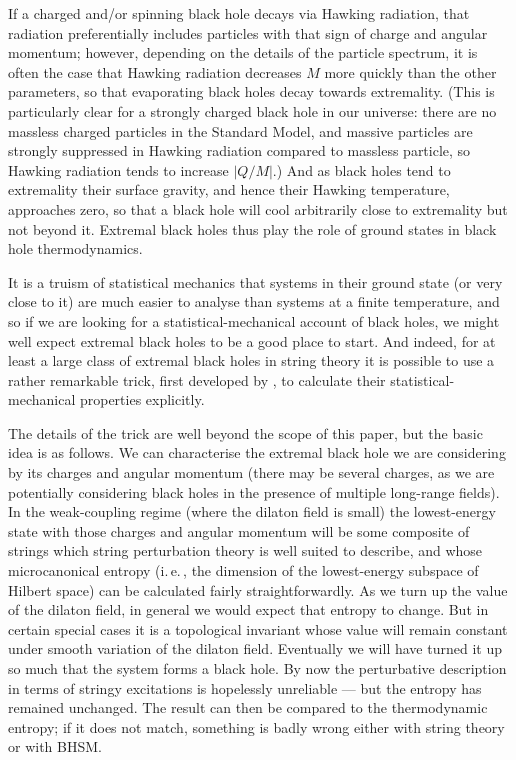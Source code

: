 \documentclass{article}
\newcommand{\iec}{\mbox{i.\,e.\,}}
\begin{document}
 If a charged and/or spinning black hole decays via Hawking radiation, that radiation preferentially includes particles with that sign of charge and angular momentum; however, depending on the details of the particle spectrum, it is often the case that Hawking radiation decreases $M$ more quickly than the other parameters, so that evaporating black holes decay towards extremality. (This is particularly clear for a strongly charged black hole in our universe: there are no massless charged particles in the Standard Model, and massive particles are strongly suppressed in Hawking radiation compared to massless particle, so Hawking radiation tends to increase $|Q/M|$.) And as black holes tend to extremality their surface gravity, and hence their Hawking temperature, approaches zero, so that a black hole will cool arbitrarily close to extremality but not beyond it. Extremal black holes thus play the role of ground states in black hole thermodynamics.
 
 It is a truism of statistical mechanics that systems in their ground state (or very close to it) are much easier to analyse than systems at a finite temperature, and so if we are looking for a statistical-mechanical account of black holes, we might well expect extremal black holes to be a good place to start. And indeed, for at least a large class of extremal black holes in string theory  it is possible to use a rather remarkable trick, first developed by , to calculate their statistical-mechanical properties explicitly.

The details of the trick are well beyond the scope of this paper, but the basic idea is as follows. We can characterise the extremal black hole we are considering by its charges and angular momentum (there may be several charges, as we are potentially considering black holes in the presence of multiple long-range fields). In the weak-coupling regime (where the dilaton field is small) the lowest-energy state with those charges and angular momentum will be some composite of strings which string perturbation theory is well suited to describe, and whose microcanonical entropy (\iec, the dimension of the lowest-energy subspace of Hilbert space) can be calculated fairly straightforwardly. As we turn up the value of the dilaton field, in general we would expect that entropy to change. But in certain special cases it is a topological invariant whose value will remain constant under smooth variation of the dilaton field. Eventually we will have turned it up so much that the system forms a black hole. By now the perturbative description in terms of stringy excitations is hopelessly unreliable --- but the entropy has remained unchanged. The result can then be compared to the thermodynamic entropy; if it does not match, something is badly wrong either with string theory or with BHSM. 
\end{document}
